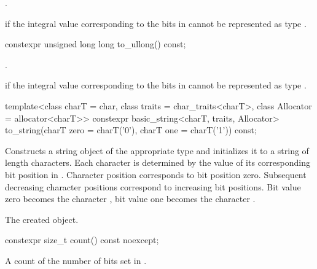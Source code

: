 \begin{itemdescr}
\pnum
\returns
{}.

\pnum
\throws
{}%
 if the integral value 
corresponding to the bits in 
cannot be represented as type .
\end{itemdescr}

%
\begin{itemdecl}
constexpr unsigned long long to_ullong() const;
\end{itemdecl}

\begin{itemdescr}
\pnum
\returns
{}.

\pnum
\throws
{}%
 if the integral value 
corresponding to the bits in 
cannot be represented as type .
\end{itemdescr}

%
\begin{itemdecl}
template<class charT = char,
         class traits = char_traits<charT>,
         class Allocator = allocator<charT>>
  constexpr basic_string<charT, traits, Allocator>
    to_string(charT zero = charT('0'), charT one = charT('1')) const;
\end{itemdecl}

\begin{itemdescr}
\pnum
\effects
Constructs a string object of the appropriate type
and initializes it to a string of length  characters.
Each character is determined by the value of its corresponding bit position in
.
Character position  corresponds to bit position zero.
Subsequent decreasing character positions correspond to increasing bit
positions.
Bit value zero becomes the character ,
bit value one becomes the character
.

\pnum
\returns
The created object.
\end{itemdescr}

%
\begin{itemdecl}
constexpr size_t count() const noexcept;
\end{itemdecl}

\begin{itemdescr}
\pnum
\returns
A count of the number of bits set in
.
\end{itemdescr}

